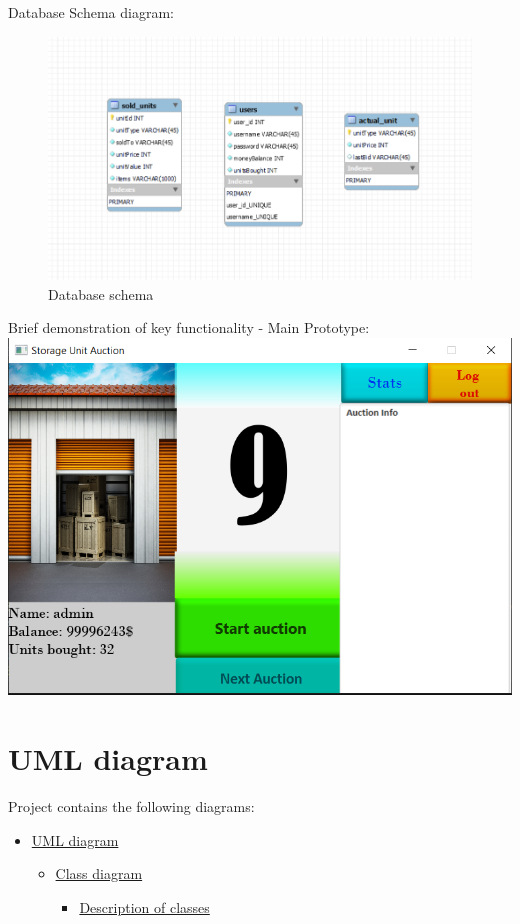 \documentclass[
]{report}
\providecommand{\tightlist}{%
  \setlength{\itemsep}{0pt}\setlength{\parskip}{0pt}}
\begin{document}
Database Schema diagram:

\begin{figure}
\centering
\includegraphics{images/database.png}
\caption{Database schema}
\end{figure}

Brief demonstration of key functionality - Main Prototype:
\includegraphics{images/auction_picture.png}

\hypertarget{uml-diagram}{%
\chapter{UML diagram}\label{uml-diagram}}

Project contains the following diagrams:

\begin{itemize}
\tightlist
\item
  \protect\hyperlink{uml-diagram}{UML diagram}

  \begin{itemize}
  \tightlist
  \item
    \protect\hyperlink{class-diagram}{Class diagram}

    \begin{itemize}
    \tightlist
    \item
      \protect\hyperlink{description-of-classes}{Description of classes}
    \end{itemize}
  \end{itemize}
\end{itemize}
\end{document}
